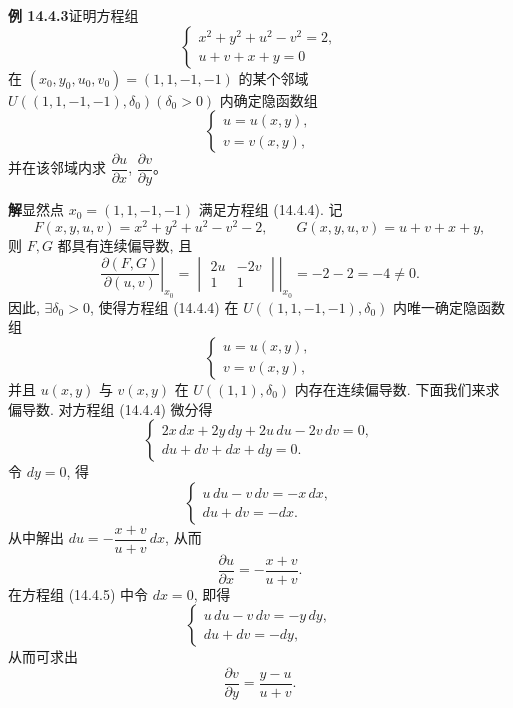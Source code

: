 \documentclass[UTF8,12pt,a4paper,fontset=fandol]{ctexart}
\begin{document}
\noindent\textbf{例 14.4.3}\quad 证明方程组
\begin{equation}
  \begin{cases}
    x^2+y^2+u^2-v^2=2,\\
    u+v+x+y=0
  \end{cases}
  \tag{14.4.4}
\end{equation}
在 $(x_0,y_0,u_0,v_0)=(1,1,-1,-1)$ 的某个邻域 $U((1,1,-1,-1),\delta_0)(\delta_0>0)$ 内确定隐函数组
\[
  \begin{cases}
    u=u(x,y),\\
    v=v(x,y),
  \end{cases}
\]
并在该邻域内求 $\dfrac{\partial u}{\partial x}$, $\dfrac{\partial v}{\partial y}$。

\noindent\textbf{解}\quad 显然点 $x_0=(1,1,-1,-1)$ 满足方程组 (14.4.4). 记
\[
  F(x,y,u,v)=x^2+y^2+u^2-v^2-2,
  \qquad
  G(x,y,u,v)=u+v+x+y,
\]
则 $F,G$ 都具有连续偏导数, 且
\[
  \left.
  \frac{\partial(F,G)}{\partial(u,v)}
  \right|_{x_0}
  =
  \left.
  \begin{vmatrix}
    2u & -2v\\
    1 & 1
  \end{vmatrix}
  \right|_{x_0}
  =-2-2=-4\ne0.
\]
因此, $\exists\delta_0>0$, 使得方程组 (14.4.4) 在 $U((1,1,-1,-1),\delta_0)$ 内唯一确定隐函数组
\[
  \begin{cases}
    u=u(x,y),\\
    v=v(x,y),
  \end{cases}
\]
并且 $u(x,y)$ 与 $v(x,y)$ 在 $U((1,1),\delta_0)$ 内存在连续偏导数. 下面我们来求偏导数. 对方程组 (14.4.4) 微分得
\begin{equation}
  \begin{cases}
    2x\,dx+2y\,dy+2u\,du-2v\,dv=0,\\
    du+dv+dx+dy=0.
  \end{cases}
  \tag{14.4.5}
\end{equation}
令 $dy=0$, 得
\[
  \begin{cases}
    u\,du-v\,dv=-x\,dx,\\
    du+dv=-dx.
  \end{cases}
\]
从中解出 $du=-\dfrac{x+v}{u+v}\,dx$, 从而
\[
  \frac{\partial u}{\partial x}=-\frac{x+v}{u+v}.
\]
在方程组 (14.4.5) 中令 $dx=0$, 即得
\[
  \begin{cases}
    u\,du-v\,dv=-y\,dy,\\
    du+dv=-dy,
  \end{cases}
\]
从而可求出
\[
  \frac{\partial v}{\partial y}=\frac{y-u}{u+v}.
\]
\end{document}
